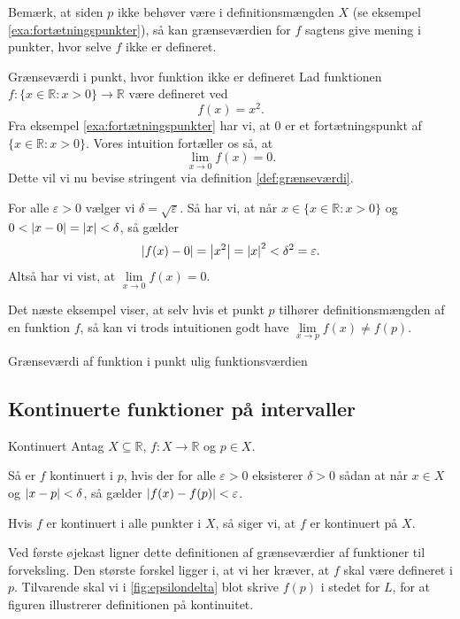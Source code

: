 Bemærk, at siden $p$ ikke behøver være i definitionsmængden $X$ (se eksempel \ref{exa:fortætningspunkter}), så kan grænseværdien for $f$ sagtens give mening i punkter, hvor selve $f$ ikke er defineret.

\begin{example}[label=exa:grænseværdi]{Grænseværdi i punkt, hvor funktion ikke er defineret}{}
 Lad funktionen $f:\{ x \in \mathbb{R}:x>0 \} \to \mathbb{R}$ være defineret ved
  \[
  f(x)= x^2.
  \] 
  Fra eksempel \ref{exa:fortætningspunkter} har vi, at $0$ er et fortætningspunkt af $\{ x \in \mathbb{R}:x>0 \} $. 
  Vores intuition fortæller os så, at
  \[
  \lim_{x \to 0} f(x)= 0.
  \] 
  Dette vil vi nu bevise stringent via definition \ref{def:grænseværdi}.

  For alle $\varepsilon >0$ vælger vi $\delta =\sqrt{\varepsilon } $. 
  Så har vi, at når $x \in \{ x \in \mathbb{R}:x>0 \} $ og $0<\abs{x-0} =\abs{x} <\delta $, så gælder
  \[
    \abs{f(x)-0} =\abs{x^2}=\abs{x}^2<\delta ^2=\varepsilon.
  \] 
  Altså har vi vist, at $\lim\limits_{x \to 0}f(x)=0$.
\end{example}

Det næste eksempel viser, at selv hvis et punkt $p$ tilhører definitionsmængden af en funktion $f$, så kan vi trods intuitionen godt have $\lim\limits_{x \to p} f(x) \neq f(p)$.

\begin{example}[label=exa:grænseværdi2]{Grænseværdi af funktion i punkt ulig funktionsværdien}{}
  
\end{example}

\subsection{Kontinuerte funktioner på intervaller}%
\label{sub:Kontinuert}


\begin{definition}[label=def:kontinuert]{Kontinuert}{}
 Antag $X \subseteq \mathbb{R}$, $f:X \to \mathbb{R}$ og $p \in X$.

  Så er $f$ kontinuert i $p$, hvis der for alle $\varepsilon >0$ eksisterer $\delta >0$ sådan at når $x \in X$ og $\abs{x-p} < \delta  $, så gælder $\abs{f(x)-f(p)}<\varepsilon $. 

  Hvis $f$ er kontinuert i alle punkter i $X$, så siger vi, at $f$ er kontinuert på $X$. 
\end{definition}

Ved første øjekast ligner dette definitionen af grænseværdier af funktioner til forveksling.
Den største forskel ligger i, at vi her kræver, at $f$ skal være defineret i $p$. 
Tilvarende skal vi i \cref{fig:epsilondelta} blot skrive $f(p)$ i stedet for $L$, for at figuren illustrerer definitionen på kontinuitet. 

